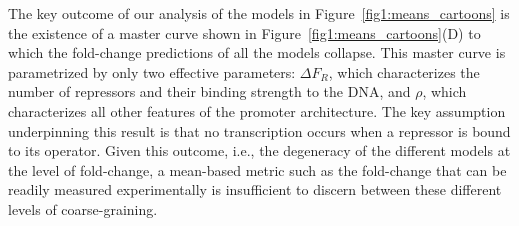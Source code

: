 The key outcome of our analysis of the models in
Figure~\ref{fig1:means_cartoons} is the existence of a master curve shown
in Figure~\ref{fig1:means_cartoons}(D) to which the fold-change predictions
of all the models collapse. This master curve is parametrized by only two
effective parameters: $\Delta F_R$, which characterizes the number of repressors
and their binding strength to the DNA, and $\rho$, which characterizes all other
features of the promoter architecture. The key assumption underpinning this
result is that no transcription occurs when a repressor is bound to its
operator. Given this outcome, i.e., the degeneracy of the different models at
the level of fold-change, a mean-based metric such as the fold-change that can
be readily measured experimentally is insufficient to discern between these
different levels of coarse-graining.